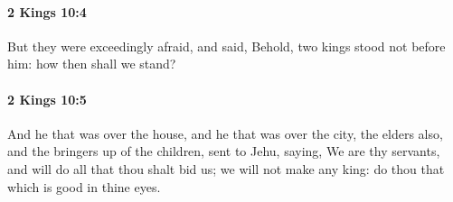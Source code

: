 		\paragraph{2 Kings 10:4} %
			\label{2KINGS-10-4}

			But they were exceedingly afraid, and said, Behold, two kings stood not before him: how then shall we stand?


		\paragraph{2 Kings 10:5} %
			\label{2KINGS-10-5}

			And he that was over the house, and he that was over the city, the elders also, and the bringers up of the children, sent to Jehu, saying, We are thy servants, and will do all that thou shalt bid us; we will not make any king: do thou that which is good in thine eyes.

